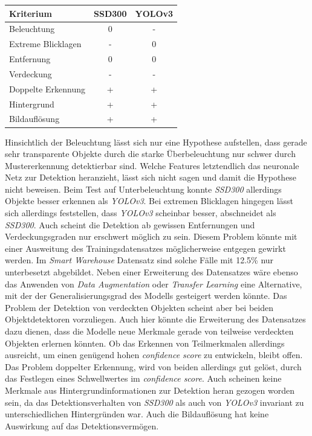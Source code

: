 \begin{center}
	\begin{tabular}[h]{l|c|c}
		Kriterium & SSD300 & YOLOv3 \\
		\hline
		Beleuchtung & 0 & - \\
		Extreme Blicklagen & - & 0 \\
		Entfernung & 0 & 0 \\
		Verdeckung & - & - \\
		Doppelte Erkennung & + & + \\
		Hintergrund & + & + \\
		Bildauflösung & + & + \\
	\end{tabular}
	\label{table:inference}
\end{center}

Hinsichtlich der Beleuchtung lässt sich nur eine Hypothese aufstellen, dass gerade sehr transparente Objekte durch die starke Überbeleuchtung nur schwer durch Mustererkennung detektierbar sind. Welche Features letztendlich das neuronale Netz zur Detektion heranzieht, lässt sich nicht sagen und damit die Hypothese nicht beweisen. Beim Test auf Unterbeleuchtung konnte \textit{SSD300} allerdings Objekte besser erkennen als \textit{YOLOv3}. Bei extremen Blicklagen hingegen lässt sich allerdings feststellen, dass \textit{YOLOv3} scheinbar besser, abschneidet als \textit{SSD300}. Auch scheint die Detektion ab gewissen Entfernungen und Verdeckungsgraden nur erschwert möglich zu sein. Diesem Problem könnte mit einer Ausweitung des Trainingsdatensatzes möglicherweise entgegen gewirkt werden. Im \textit{Smart Warehouse} Datensatz sind solche Fälle mit 12.5\% nur unterbesetzt abgebildet. Neben einer Erweiterung des Datensatzes wäre ebenso das Anwenden von \textit{Data Augmentation} oder \textit{Transfer Learning} eine Alternative, mit der der Generalisierungsgrad des Modells gesteigert werden könnte. Das Problem der Detektion von verdeckten Objekten scheint aber bei beiden Objektdetektoren vorzuliegen. Auch hier könnte die Erweiterung des Datensatzes dazu dienen, dass die Modelle neue Merkmale gerade von teilweise verdeckten Objekten erlernen könnten. Ob das Erkennen von Teilmerkmalen allerdings ausreicht, um einen genügend hohen \textit{confidence score} zu entwickeln, bleibt offen. Das Problem doppelter Erkennung, wird von beiden allerdings gut gelöst, durch das Festlegen eines Schwellwertes im \textit{confidence score}. Auch scheinen keine Merkmale aus Hintergrundinformationen zur Detektion heran gezogen worden sein, da das Detektionsverhalten von \textit{SSD300} als auch von \textit{YOLOv3} invariant zu unterschiedlichen Hintergründen war. Auch die Bildauflösung hat keine Auswirkung auf das Detektionsvermögen.

